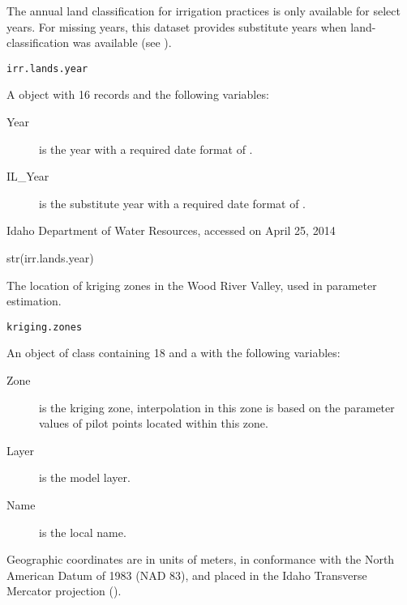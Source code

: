 \documentclass[a4paper]{book}
\begin{document}
%
\begin{Description}\relax
The annual land classification for irrigation practices is only available for select years.
For missing years, this dataset provides substitute years when land-classification was available (see ).
\end{Description}
%
\begin{Usage}
\begin{verbatim}
irr.lands.year
\end{verbatim}
\end{Usage}
%
\begin{Format}
A  object with 16 records and the following variables:
\begin{description}

\item[Year] is the year with a required date format of .
\item[IL\_Year] is the substitute year with a required date format of .

\end{description}

\end{Format}
%
\begin{Source}\relax
Idaho Department of Water Resources, accessed on April 25, 2014
\end{Source}
%
\begin{Examples}
\begin{ExampleCode}
str(irr.lands.year)
\end{ExampleCode}
\end{Examples}
%
\begin{Description}\relax
The location of kriging zones in the Wood River Valley, used in parameter estimation.
\end{Description}
%
\begin{Usage}
\begin{verbatim}
kriging.zones
\end{verbatim}
\end{Usage}
%
\begin{Format}
An object of  class containing 18  and a  with the following variables:
\begin{description}

\item[Zone] is the kriging zone, interpolation in this zone is based on the parameter values of pilot points located within this zone.
\item[Layer] is the model layer.
\item[Name] is the local name.

\end{description}

Geographic coordinates are in units of meters, in conformance with the North American Datum of 1983 (NAD 83), and placed in the
Idaho Transverse Mercator projection ().
\end{Format}
\end{document}
